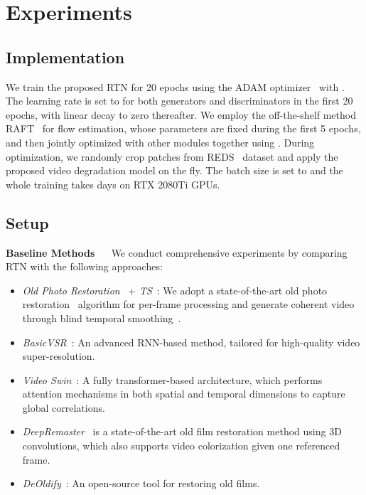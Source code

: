 \documentclass[10pt,twocolumn,letterpaper]{article}
\begin{document}
	
	
	
	
	
	\section{Experiments}
	
	
	\subsection{Implementation}
	We train the proposed RTN for 20 epochs using the ADAM optimizer~\cite{kingma2014adam} with . The learning rate is set to  for both generators and discriminators in the first 20 epochs, with linear decay to zero thereafter. We employ the off-the-shelf method RAFT~\cite{teed2020raft} for flow estimation, whose parameters are fixed during the first 5 epochs, and then jointly optimized with other modules together using . During optimization, we randomly crop  patches from REDS~\cite{Nah_2019_CVPR_Workshops_REDS} dataset and apply the proposed video degradation model on the fly. The batch size is set to  and the whole training takes  days on  RTX 2080Ti GPUs.
	
	\subsection{Setup}
	
	\noindent\textbf{Baseline Methods} ~~ We conduct comprehensive experiments by comparing RTN with the following approaches:
	\begin{itemize}[leftmargin=*]
		\itemsep0em 
		\item \textit{Old Photo Restoration}~\cite{wan2020bringing} + \textit{TS}~\cite{lai2018learning}: We adopt a state-of-the-art old photo restoration~\cite{wan2020bringing} algorithm for per-frame processing and generate coherent video through blind temporal smoothing~\cite{lai2018learning}.
		\item \textit{BasicVSR}~\cite{chan2021basicvsr}: An advanced RNN-based method, tailored for high-quality video super-resolution.
		\item \textit{Video Swin}~\cite{liu2021video}: A fully transformer-based architecture, which performs attention mechanisms in both spatial and temporal dimensions to capture global correlations. 
		\item \textit{DeepRemaster}~\cite{iizuka2019deepremaster} is a state-of-the-art old film restoration method using 3D convolutions, which also supports video colorization given one referenced frame. 
		\item \textit{DeOldify}~\cite{DeOldify}: An open-source tool for restoring old films.
	\end{itemize}
	
\end{document}
